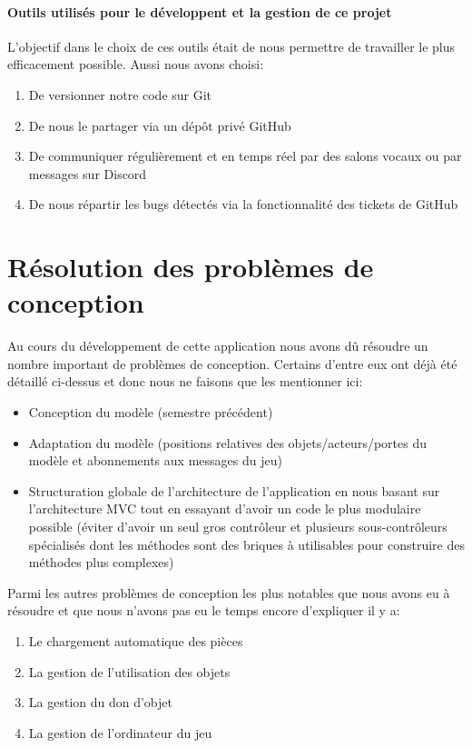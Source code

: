 \documentclass[./standalone.tex]{subfiles}
\begin{document}
\paragraph{Outils utilisés pour le développent et la gestion de ce projet\\}
L'objectif dans le choix de ces outils était de nous permettre de travailler le plus efficacement possible. Aussi nous avons choisi:
\begin{enumerate}
	\item De versionner notre code sur Git
	\item De nous le partager via un dépôt privé GitHub
	\item De communiquer régulièrement et en temps réel par des salons vocaux ou par messages sur Discord
	\item De nous répartir les bugs détectés via la fonctionnalité des tickets de GitHub
\end{enumerate}


\section{Résolution des problèmes de conception}
Au cours du développement de cette application nous avons dû résoudre un nombre important de problèmes de conception. Certains d'entre eux ont déjà été détaillé ci-dessus et donc nous ne faisons que les mentionner ici:

\begin{itemize}
	\item Conception du modèle (semestre précédent)
	\item Adaptation du modèle (positions relatives des objets/acteurs/portes du modèle et abonnements aux messages du jeu)
	\item Structuration globale de l'architecture de l'application en nous basant sur l'architecture MVC tout en essayant d'avoir un code le plus modulaire possible (éviter d'avoir un seul gros contrôleur et plusieurs sous-contrôleurs spécialisés dont les méthodes sont des briques à utilisables pour construire des méthodes plus complexes)\\
\end{itemize}

Parmi les autres problèmes de conception les plus notables que nous avons eu à résoudre et que nous n'avons pas eu le temps encore d'expliquer il y a:

\begin{enumerate}
	\item Le chargement automatique des pièces
	\item La gestion de l'utilisation des objets
	\item La gestion du don d'objet
	\item La gestion de l'ordinateur du jeu
\end{enumerate}
\end{document}
